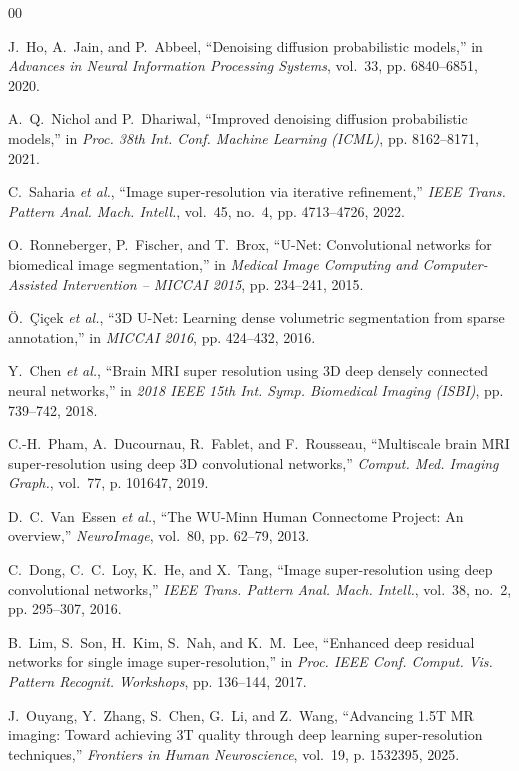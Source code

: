 \documentclass[10pt,journal]{IEEEtran}
\begin{document}
\begin{thebibliography}{00}

J.~Ho, A.~Jain, and P.~Abbeel, ``Denoising diffusion probabilistic
models,'' in \emph{Advances in Neural Information Processing Systems},
vol.~33, pp. 6840--6851, 2020.

A.~Q.~Nichol and P.~Dhariwal, ``Improved denoising diffusion
probabilistic models,'' in \emph{Proc. 38th Int. Conf. Machine
Learning (ICML)}, pp. 8162--8171, 2021.

C.~Saharia \emph{et al.}, ``Image super-resolution via iterative
refinement,'' \emph{IEEE Trans. Pattern Anal. Mach. Intell.},
vol.~45, no.~4, pp. 4713--4726, 2022.

O.~Ronneberger, P.~Fischer, and T.~Brox, ``U-Net: Convolutional
networks for biomedical image segmentation,'' in \emph{Medical Image
Computing and Computer-Assisted Intervention -- MICCAI 2015},
pp. 234--241, 2015.

{\"O}.~{\c{C}}i{\c{c}}ek \emph{et al.}, ``3D U-Net: Learning dense
volumetric segmentation from sparse annotation,'' in \emph{MICCAI
2016}, pp. 424--432, 2016.

Y.~Chen \emph{et al.}, ``Brain MRI super resolution using 3D deep
densely connected neural networks,'' in \emph{2018 IEEE 15th Int.
Symp. Biomedical Imaging (ISBI)}, pp. 739--742, 2018.

C.-H.~Pham, A.~Ducournau, R.~Fablet, and F.~Rousseau, ``Multiscale
brain MRI super-resolution using deep 3D convolutional networks,''
\emph{Comput. Med. Imaging Graph.}, vol.~77, p. 101647, 2019.

D.~C.~Van~Essen \emph{et al.}, ``The WU-Minn Human Connectome
Project: An overview,'' \emph{NeuroImage}, vol.~80, pp. 62--79, 2013.

C.~Dong, C.~C.~Loy, K.~He, and X.~Tang, ``Image super-resolution
using deep convolutional networks,'' \emph{IEEE Trans. Pattern Anal.
Mach. Intell.}, vol.~38, no.~2, pp. 295--307, 2016.

B.~Lim, S.~Son, H.~Kim, S.~Nah, and K.~M.~Lee, ``Enhanced deep
residual networks for single image super-resolution,'' in \emph{Proc.
IEEE Conf. Comput. Vis. Pattern Recognit. Workshops}, pp. 136--144,
2017.

J.~Ouyang, Y.~Zhang, S.~Chen, G.~Li, and Z.~Wang, ``Advancing
1.5T MR imaging: Toward achieving 3T quality through deep learning
super-resolution techniques,'' \emph{Frontiers in Human Neuroscience},
vol.~19, p. 1532395, 2025.


\end{thebibliography}
\end{document}
